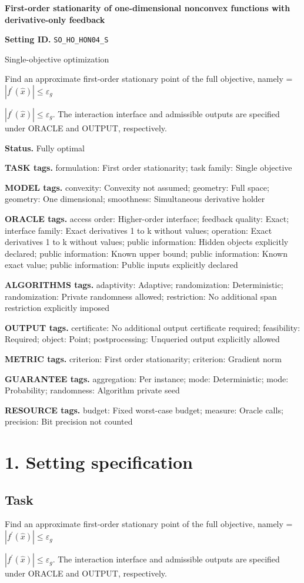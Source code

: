 \documentclass[10pt,a4paper]{article}
\newcommand{\AtlasMath}[1]{\par\begingroup\centering\setbox0=\hbox{$\displaystyle #1$}\ifdim\wd0>1.4\linewidth\typeout{ATLAS WIDE FORMULA: \the\wd0}\fi\ifdim\wd0>\linewidth\resizebox{\linewidth}{!}{\box0}\else\box0\fi\par\endgroup}
\newcommand{\AtlasInlineMath}[1]{\begingroup\setbox0=\hbox{$#1$}\ifdim\wd0>.4\linewidth\endgroup\AtlasMath{#1}\else\endgroup$#1$\fi}
\begin{document}
\raggedright

{\LARGE\bfseries\sffamily\color{AtlasNavy} First-order stationarity of one-dimensional nonconvex functions with derivative-only feedback\par}\vspace{5pt}
\textbf{Setting ID.} \texttt{SO\_\allowbreak{}HO\_\allowbreak{}HON04\_\allowbreak{}S}

Single-objective optimization

Find an approximate first-order stationary point of the full objective, namely \AtlasInlineMath{|f^{\prime}(\widehat{x})|\le\varepsilon_g}. The interaction interface and admissible outputs are specified under ORACLE and OUTPUT, respectively.

\textbf{Status.} Fully optimal

\textbf{TASK tags.} formulation: First order stationarity; task family: Single objective

\textbf{MODEL tags.} convexity: Convexity not assumed; geometry: Full space; geometry: One dimensional; smoothness: Simultaneous derivative holder

\textbf{ORACLE tags.} access order: Higher-order interface; feedback quality: Exact; interface family: Exact derivatives 1 to k without values; operation: Exact derivatives 1 to k without values; public information: Hidden objects explicitly declared; public information: Known upper bound; public information: Known exact value; public information: Public inputs explicitly declared

\textbf{ALGORITHMS tags.} adaptivity: Adaptive; randomization: Deterministic; randomization: Private randomness allowed; restriction: No additional span restriction explicitly imposed

\textbf{OUTPUT tags.} certificate: No additional output certificate required; feasibility: Required; object: Point; postprocessing: Unqueried output explicitly allowed

\textbf{METRIC tags.} criterion: First order stationarity; criterion: Gradient norm

\textbf{GUARANTEE tags.} aggregation: Per instance; mode: Deterministic; mode: Probability; randomness: Algorithm private seed

\textbf{RESOURCE tags.} budget: Fixed worst-case budget; measure: Oracle calls; precision: Bit precision not counted

\section{1. Setting specification}
\subsection{Task}
Find an approximate first-order stationary point of the full objective, namely \AtlasInlineMath{|f^{\prime}(\widehat{x})|\le\varepsilon_g}. The interaction interface and admissible outputs are specified under ORACLE and OUTPUT, respectively.
\end{document}
